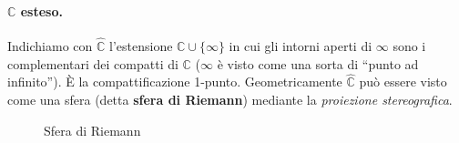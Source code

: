 \paragraph{\(\mathbb{C}\) esteso.} Indichiamo con \(\hat{\mathbb{C}}\)
l'estensione \(\mathbb{C} \cup \{\infty\} \) in cui gli intorni aperti di
\(\infty\) sono i complementari dei compatti di \(\mathbb{C}\) (\(\infty\) è
visto come una sorta di ``punto ad infinito''). È la compattificazione 1-punto.
Geometricamente \(\hat{\mathbb{C}}\) può essere visto come una sfera (detta
\textbf{sfera di Riemann}) mediante la \emph{proiezione stereografica}.
\begin{figure}[ht]
    \centering
    \caption{Sfera di Riemann}
    \label{fig:sfera-di-riemann}
\end{figure}


